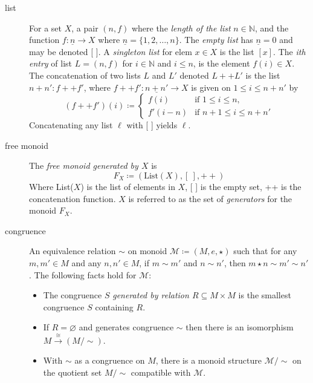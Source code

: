 \documentclass{article}
\begin{document}
\begin{description}
\item[list] For a set $X$, a pair $(n,f)$ where the \emph{length of the list} $n \in \mathbb{N}$, and the function $f: \underline{n} \rightarrow X$ where $\underline{n} = \{1,2,\ldots,n\}$.
The \emph{empty list} has $\underline{n} = 0$ and may be denoted [ ].
A \emph{singleton list} for elem $x \in X$ is the list $[x]$.
The \emph{ith entry} of list $L = (n,f)$ for $i \in \mathbb{N}$ and $i \le n$, is the element $f(i) \in X$.
The concatenation of two lists $L$ and $L'$ denoted $L++L'$ is the list $n+n':f++f'$, where $f++f':\underline{n + n'} \rightarrow X$ is given on $1 \le i \le n + n'$ by
\begin{equation*}
(f++f')(i) \coloneqq
\begin{cases}
f(i) & \text{if } 1 \le i \le n, \\
f'(i - n) & \text{if } n+1 \le i \le n + n'
\end{cases}
\end{equation*}
\qquad Concatenating any list $\ell$ with [ ] yields $\ell$.

\item[free monoid] The \emph{free monoid generated by $X$} is
\begin{equation*}
F_X \coloneqq (\text{List}(X),[\ ], ++)
\end{equation*}
Where List($X$) is the list of elements in $X$, [ ] is the empty set, ++ is the concatenation function. $X$ is referred to as the set of \emph{generators} for the monoid $F_X$.

\item[congruence] An equivalence relation $\sim$ on monoid $\mathcal{M} \coloneqq (M, e, \star)$ such that for any $m,m' \in M$ and any $n,n' \in M$, if $m \sim m'$ and $n \sim n'$, then $m \star n \sim m' \sim n'$. The following facts hold for $\mathcal{M}$:
\begin{itemize}
\item The congruence $S$ \emph{generated by relation $R \subseteq M \times M$} is the smallest congruence $S$ containing $R$.
\item If $R = \varnothing$ and generates congruence $\sim$ then there is an isomorphism $M \stackrel{\cong}{\longrightarrow} (M/\sim)$.
\item With $\sim$ as a congruence on $M$, there is a monoid structure $\mathcal{M}/\sim$ on the quotient set $M/\sim$ compatible with $\mathcal{M}$.
\end{itemize}


\end{description}
\end{document}
